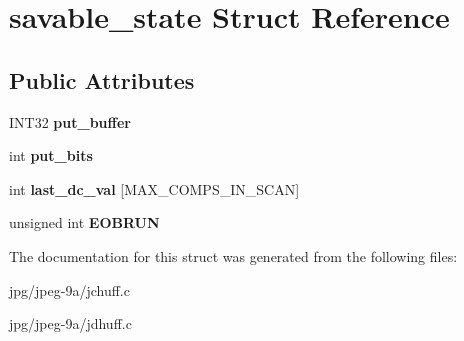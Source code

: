 \hypertarget{structsavable__state}{\section{savable\+\_\+state Struct Reference}
\label{structsavable__state}
}
\subsection*{Public Attributes}
\begin{DoxyCompactItemize}
\item 
\hypertarget{structsavable__state_a71fdab6bc3ab791e85f61179045da4dd}{I\+N\+T32 {\bfseries put\+\_\+buffer}}\label{structsavable__state_a71fdab6bc3ab791e85f61179045da4dd}

\item 
\hypertarget{structsavable__state_a767d7a21d1bd5bee01108b947bfc9fbf}{int {\bfseries put\+\_\+bits}}\label{structsavable__state_a767d7a21d1bd5bee01108b947bfc9fbf}

\item 
\hypertarget{structsavable__state_a828b78727611f4ff5353d24cf7230d85}{int {\bfseries last\+\_\+dc\+\_\+val} \mbox{[}M\+A\+X\+\_\+\+C\+O\+M\+P\+S\+\_\+\+I\+N\+\_\+\+S\+C\+A\+N\mbox{]}}\label{structsavable__state_a828b78727611f4ff5353d24cf7230d85}

\item 
\hypertarget{structsavable__state_a23c64b6c9ba0c84041e1a0533c2312cb}{unsigned int {\bfseries E\+O\+B\+R\+U\+N}}\label{structsavable__state_a23c64b6c9ba0c84041e1a0533c2312cb}

\end{DoxyCompactItemize}


The documentation for this struct was generated from the following files\+:\begin{DoxyCompactItemize}
\item 
jpg/jpeg-\/9a/jchuff.\+c\item 
jpg/jpeg-\/9a/jdhuff.\+c\end{DoxyCompactItemize}
